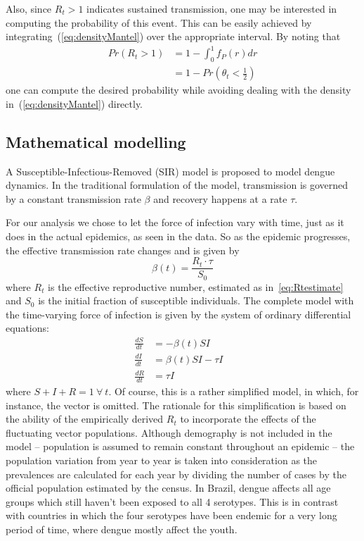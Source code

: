 \documentclass[10pt]{article}
\begin{document}
Also, since $R_t > 1$ indicates sustained transmission, one may be 
interested in computing the probability of this event.
This can be easily achieved by integrating~(\ref{eq:densityMantel}) over the 
appropriate interval.
By noting that
\begin{align}
\label{cumprobMantel}
Pr(R_t > 1) &= 1 - \int_0^1 f_P(r)dr \\
            &= 1- Pr(\theta_t < \frac{1}{2})
\end{align}
one can compute the desired probability while avoiding dealing with the density 
in~(\ref{eq:densityMantel}) directly.

\subsection*{Mathematical modelling} %

A Susceptible-Infectious-Removed (SIR) model is proposed to model dengue 
dynamics.
In the traditional formulation of the model, transmission is governed by a 
constant transmission rate $\beta$ and recovery happens at a rate $\tau$.

For our analysis we chose to let the force of infection vary with time, just 
as it does in the actual epidemics, as seen in the data. So as the epidemic 
progresses, the effective transmission  rate changes and is 
given by 
\begin{equation} 
 \label{eq:effbeta}
 \beta(t) = \frac{R_t\cdot\tau}{S_0}
\end{equation}
where $R_t$ is the effective reproductive number, estimated as 
in~\ref{eq:Rtestimate} and $S_0$ is the initial fraction of susceptible 
individuals.
The complete model with the time-varying force of infection is given by
the system of ordinary differential equations:
\begin{align}
   \label{eq:model}
 \frac{dS}{dt} &= -\beta(t)SI \\     \nonumber
 \frac{dI}{dt} &= \beta(t)SI - \tau I&\\      \nonumber
 \frac{dR}{dt} &= \tau I&
\end{align}  
where $S + I + R = 1 \: \forall\: t$. %
Of course, this is a rather simplified model, in which, for instance, the 
vector is omitted.
The rationale for this simplification is based on the ability of the 
empirically derived $R_t$  to incorporate the effects of the fluctuating vector 
populations. Although demography is not included in the model -- population is 
assumed to remain constant throughout an epidemic -- the population variation 
from year to year is taken into consideration as the prevalences are calculated 
for each year by dividing the number of cases by the official population 
estimated by the census. In Brazil, dengue affects all age groups which still 
haven't been exposed to all 4 serotypes. This is in contrast with countries in 
which the four serotypes have been endemic for a very long period of time, 
where dengue mostly affect the youth.
\end{document}
